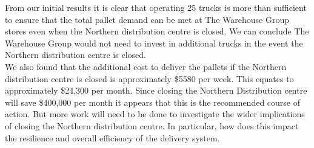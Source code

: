 \documentclass[11pt, a4paper]{article}   	%
\begin{document}
\noindent From our initial results it is clear that operating 25 trucks is more than sufficient to ensure that the total pallet demand can be met at The Warehouse Group stores even when the Northern distribution centre is closed. We can conclude The Warehouse Group would not need to invest in additional trucks in the event the Northern distribution centre is closed.  \\ 

\noindent We also found that the additional cost to deliver the pallets if the Northern distribution centre is closed is approximately \$5580 per week. This equates to approximately \$24,300 per month. Since closing the Northern Distribution centre will save \$400,000 per month it appears that this is the recommended course of action. But more work will need to be done to investigate the wider implications of closing the Northern distribution centre. In particular, how does this impact the resilience and overall efficiency of the delivery system.
\end{document}
